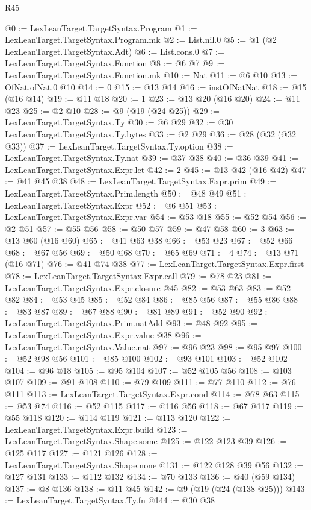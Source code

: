 \begin{lexlean}{R45}
\begin{coremodule}
@0 := LexLeanTarget.TargetSyntax.Program
@1 := LexLeanTarget.TargetSyntax.Program.mk
@2 := List.nil.{0}
@5 := @1 (@2 LexLeanTarget.TargetSyntax.Adt)
@6 := List.cons.{0}
@7 := LexLeanTarget.TargetSyntax.Function
@8 := @6 @7
@9 := LexLeanTarget.TargetSyntax.Function.mk
@10 := Nat
@11 := @6 @10
@13 := OfNat.ofNat.{0} @10
@14 := 0
@15 := @13 @14
@16 := instOfNatNat
@18 := @15 (@16 @14)
@19 := @11 @18
@20 := 1
@23 := @13 @20 (@16 @20)
@24 := @11 @23
@25 := @2 @10
@28 := @9 (@19 (@24 @25))
@29 := LexLeanTarget.TargetSyntax.Ty
@30 := @6 @29
@32 := @30 LexLeanTarget.TargetSyntax.Ty.bytes
@33 := @2 @29
@36 := @28 (@32 (@32 @33))
@37 := LexLeanTarget.TargetSyntax.Ty.option
@38 := LexLeanTarget.TargetSyntax.Ty.nat
@39 := @37 @38
@40 := @36 @39
@41 := LexLeanTarget.TargetSyntax.Expr.let
@42 := 2
@45 := @13 @42 (@16 @42)
@47 := @41 @45 @38
@48 := LexLeanTarget.TargetSyntax.Expr.prim
@49 := LexLeanTarget.TargetSyntax.Prim.length
@50 := @48 @49
@51 := LexLeanTarget.TargetSyntax.Expr
@52 := @6 @51
@53 := LexLeanTarget.TargetSyntax.Expr.var
@54 := @53 @18
@55 := @52 @54
@56 := @2 @51
@57 := @55 @56
@58 := @50 @57
@59 := @47 @58
@60 := 3
@63 := @13 @60 (@16 @60)
@65 := @41 @63 @38
@66 := @53 @23
@67 := @52 @66
@68 := @67 @56
@69 := @50 @68
@70 := @65 @69
@71 := 4
@74 := @13 @71 (@16 @71)
@76 := @41 @74 @38
@77 := LexLeanTarget.TargetSyntax.Expr.first
@78 := LexLeanTarget.TargetSyntax.Expr.call
@79 := @78 @23
@81 := LexLeanTarget.TargetSyntax.Expr.closure @45
@82 := @53 @63
@83 := @52 @82
@84 := @53 @45
@85 := @52 @84
@86 := @85 @56
@87 := @55 @86
@88 := @83 @87
@89 := @67 @88
@90 := @81 @89
@91 := @52 @90
@92 := LexLeanTarget.TargetSyntax.Prim.natAdd
@93 := @48 @92
@95 := LexLeanTarget.TargetSyntax.Expr.value @38
@96 := LexLeanTarget.TargetSyntax.Value.nat
@97 := @96 @23
@98 := @95 @97
@100 := @52 @98 @56
@101 := @85 @100
@102 := @93 @101
@103 := @52 @102
@104 := @96 @18
@105 := @95 @104
@107 := @52 @105 @56
@108 := @103 @107
@109 := @91 @108
@110 := @79 @109
@111 := @77 @110
@112 := @76 @111
@113 := LexLeanTarget.TargetSyntax.Expr.cond
@114 := @78 @63
@115 := @53 @74
@116 := @52 @115
@117 := @116 @56
@118 := @67 @117
@119 := @55 @118
@120 := @114 @119
@121 := @113 @120
@122 := LexLeanTarget.TargetSyntax.Expr.build
@123 := LexLeanTarget.TargetSyntax.Shape.some
@125 := @122 @123 @39
@126 := @125 @117
@127 := @121 @126
@128 := LexLeanTarget.TargetSyntax.Shape.none
@131 := @122 @128 @39 @56
@132 := @127 @131
@133 := @112 @132
@134 := @70 @133
@136 := @40 (@59 @134)
@137 := @8 @136
@138 := @11 @45
@142 := @9 (@19 (@24 (@138 @25)))
@143 := LexLeanTarget.TargetSyntax.Ty.fn
@144 := @30 @38

\end{coremodule}
\end{lexlean}
